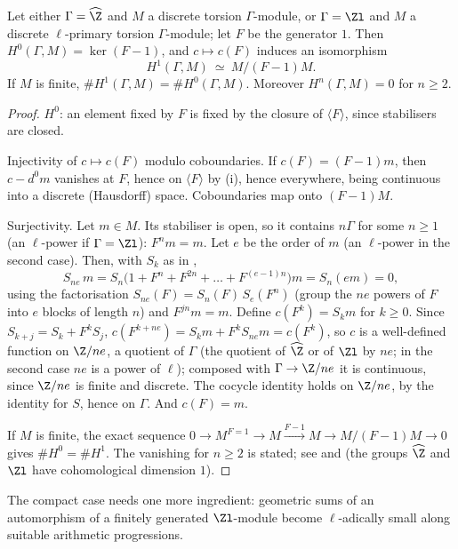 \begin{theorem}\label{thm:cohomology:procyclic-discrete}
Let either $\Gamma=\widehat\Z$ and $M$ a discrete torsion $\Gamma$-module, or $\Gamma=\Zl$ and $M$ a discrete $\ell$-primary torsion $\Gamma$-module; let $F$ be the
generator $1$. Then $H^0(\Gamma,M)=\ker(F-1)$, and $c\mapsto c(F)$ induces an isomorphism
\[
H^1(\Gamma,M)\ \simeq\ M/(F-1)M .
\]
If $M$ is finite, $\#H^1(\Gamma,M)=\#H^0(\Gamma,M)$. Moreover $H^n(\Gamma,M)=0$ for $n\ge2$.
\end{theorem}

\begin{proof}
$H^0$: an element fixed by $F$ is fixed by the closure of $\langle F\rangle$, since stabilisers are closed.

Injectivity of $c\mapsto c(F)$ modulo coboundaries. If $c(F)=(F-1)m$, then $c-d^0m$ vanishes at $F$, hence on $\langle F\rangle$ by (i), hence
everywhere, being continuous into a discrete (Hausdorff) space. Coboundaries map onto $(F-1)M$.

Surjectivity. Let $m\in M$. Its stabiliser is open, so it contains $n\Gamma$ for some $n\ge1$ (an $\ell$-power if $\Gamma=\Zl$): $F^nm=m$. Let $e$ be the order of
$m$ (an $\ell$-power in the second case). Then, with $S_k$ as in ,
\[
S_{ne}\,m=S_n\bigl(1+F^n+F^{2n}+\dots+F^{(e-1)n}\bigr)m=S_n(em)=0 ,
\]
using the factorisation $S_{ne}(F)=S_n(F)\,S_e(F^n)$ (group the $ne$ powers of $F$ into $e$ blocks of length $n$) and $F^{jn}m=m$. Define $c(F^k)=S_km$ for
$k\ge0$. Since $S_{k+j}=S_k+F^kS_j$, $c(F^{k+ne})=S_km+F^kS_{ne}m=c(F^k)$, so $c$ is a well-defined function on $\Z/ne$, a quotient of $\Gamma$ (the quotient of $\widehat\Z$
or of $\Zl$ by $ne$; in the second case $ne$ is a power of $\ell$); composed with $\Gamma\to\Z/ne$ it is continuous, since $\Z/ne$ is finite and discrete. The cocycle identity holds on $\Z/ne$, by the identity for $S$, hence on $\Gamma$. And $c(F)=m$.

If $M$ is finite, the exact sequence $0\to M^{F=1}\to M\xrightarrow{F-1}M\to M/(F-1)M\to0$ gives $\#H^0=\#H^1$. The vanishing for $n\ge2$ is stated; see
\cite[Chapter XIII, Section 1]{SerreLocalFields} and \cite[Chapter I, Sections 3 and 4]{SerreGaloisCoh} (the groups $\widehat\Z$ and $\Zl$ have cohomological dimension $1$).
\end{proof}

The compact case needs one more ingredient: geometric sums of an automorphism of a finitely generated $\Zl$-module become $\ell$-adically small along
suitable arithmetic progressions.

